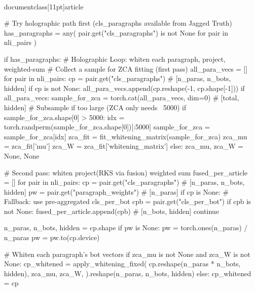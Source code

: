 \\documentclass[11pt]{article}
\begin{document}
\begin{CodeBlock}
            # Try holographic path first (cls_paragraphs available from Jagged Truth)
            has_paragraphs = any(
                pair.get("cls_paragraphs") is not None for pair in nli_pairs
            )

            if has_paragraphs:
                #  Holographic Loop: whiten each paragraph, project, weighted-sum 
                # Collect a sample for ZCA fitting (first pass)
                all_para_vecs = []
                for pair in nli_pairs:
                    cp = pair.get("cls_paragraphs")  # [n_paras, n_bots, hidden]
                    if cp is not None:
                        all_para_vecs.append(cp.reshape(-1, cp.shape[-1]))
                if all_para_vecs:
                    sample_for_zca = torch.cat(all_para_vecs, dim=0)  # [total, hidden]
                    # Subsample if too large (ZCA only needs ~5000)
                    if sample_for_zca.shape[0] > 5000:
                        idx = torch.randperm(sample_for_zca.shape[0])[:5000]
                        sample_for_zca = sample_for_zca[idx]
                    zca_fit = fit_whitening_matrix(sample_for_zca)
                    zca_mu = zca_fit['mu']
                    zca_W = zca_fit['whitening_matrix']
                else:
                    zca_mu, zca_W = None, None

                # Second pass: whiten  project(RKS via fusion)  weighted sum
                fused_per_article = []
                for pair in nli_pairs:
                    cp = pair.get("cls_paragraphs")   # [n_paras, n_bots, hidden]
                    pw = pair.get("paragraph_weights") # [n_paras]
                    if cp is None:
                        # Fallback: use pre-aggregated cls_per_bot
                        cpb = pair.get("cls_per_bot")
                        if cpb is not None:
                            fused_per_article.append(cpb)  # [n_bots, hidden]
                        continue

                    n_paras, n_bots, hidden = cp.shape
                    if pw is None:
                        pw = torch.ones(n_paras) / n_paras
                    pw = pw.to(cp.device)

                    # Whiten each paragraph's bot vectors
                    if zca_mu is not None and zca_W is not None:
                        cp_whitened = apply_whitening_fixed(
                            cp.reshape(n_paras * n_bots, hidden),
                            zca_mu, zca_W,
                        ).reshape(n_paras, n_bots, hidden)
                    else:
                        cp_whitened = cp


\end{CodeBlock}
\end{document}
